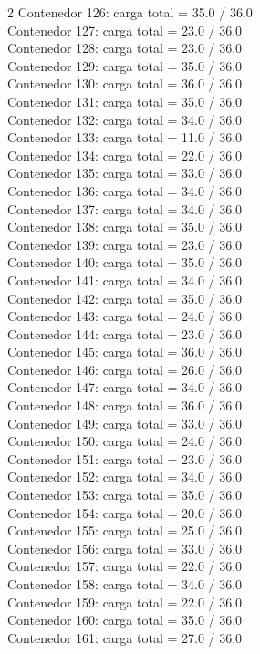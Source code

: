 \begin{multicols}{2}
Contenedor 126: carga total = 35.0 / 36.0\\
Contenedor 127: carga total = 23.0 / 36.0\\
Contenedor 128: carga total = 23.0 / 36.0\\
Contenedor 129: carga total = 35.0 / 36.0\\
Contenedor 130: carga total = 36.0 / 36.0\\
Contenedor 131: carga total = 35.0 / 36.0\\
Contenedor 132: carga total = 34.0 / 36.0\\
Contenedor 133: carga total = 11.0 / 36.0\\
Contenedor 134: carga total = 22.0 / 36.0\\
Contenedor 135: carga total = 33.0 / 36.0\\
Contenedor 136: carga total = 34.0 / 36.0\\
Contenedor 137: carga total = 34.0 / 36.0\\
Contenedor 138: carga total = 35.0 / 36.0\\
Contenedor 139: carga total = 23.0 / 36.0\\
Contenedor 140: carga total = 35.0 / 36.0\\
Contenedor 141: carga total = 34.0 / 36.0\\
Contenedor 142: carga total = 35.0 / 36.0\\
Contenedor 143: carga total = 24.0 / 36.0\\
Contenedor 144: carga total = 23.0 / 36.0\\
Contenedor 145: carga total = 36.0 / 36.0\\
Contenedor 146: carga total = 26.0 / 36.0\\
Contenedor 147: carga total = 34.0 / 36.0\\
Contenedor 148: carga total = 36.0 / 36.0\\
Contenedor 149: carga total = 33.0 / 36.0\\
Contenedor 150: carga total = 24.0 / 36.0\\
Contenedor 151: carga total = 23.0 / 36.0\\
Contenedor 152: carga total = 34.0 / 36.0\\
Contenedor 153: carga total = 35.0 / 36.0\\
Contenedor 154: carga total = 20.0 / 36.0\\
Contenedor 155: carga total = 25.0 / 36.0\\
Contenedor 156: carga total = 33.0 / 36.0\\
Contenedor 157: carga total = 22.0 / 36.0\\
Contenedor 158: carga total = 34.0 / 36.0\\
Contenedor 159: carga total = 22.0 / 36.0\\
Contenedor 160: carga total = 35.0 / 36.0\\
Contenedor 161: carga total = 27.0 / 36.0\\
\end{multicols}